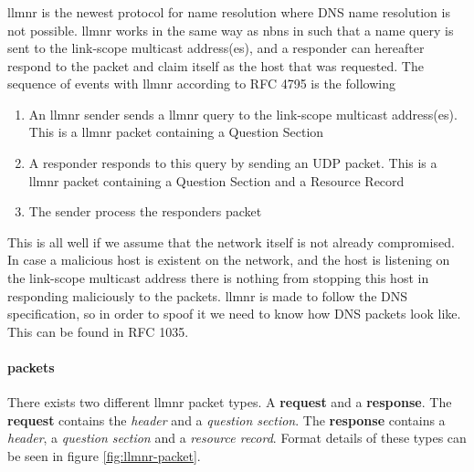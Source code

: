 \documentclass{article}
\begin{document}
\subsubsection{}
\label{sec:llmnr}
\gls{llmnr} is the newest protocol for name resolution where DNS name resolution is not possible\cite{url:rfc:llmnr}. \gls{llmnr} works in the same way as \gls{nbns} in such that a name query is sent to the link-scope multicast address(es), and a responder can hereafter respond to the packet and claim itself as the host that was requested. The sequence of events with \gls{llmnr} according to RFC 4795\cite{url:rfc:llmnr} is the following
\begin{enumerate}
	\item An \gls{llmnr} sender sends a \gls{llmnr} query to the link-scope multicast address(es). This is a \gls{llmnr} packet containing a Question Section
	\item A responder responds to this query by sending an UDP packet. This is a \gls{llmnr} packet containing a Question Section and a Resource Record
	\item The sender process the responders packet
\end{enumerate}

This is all well if we assume that the network itself is not already compromised. In case a malicious host is existent on the network, and the host is listening on the link-scope multicast address there is nothing from stopping this host in responding maliciously to the packets. \gls{llmnr} is made to follow the DNS specification, so in order to spoof it we need to know how DNS packets look like. This can be found in RFC 1035\cite{url:rfc:dns}.

\paragraph{ packets}

There exists two different \gls{llmnr} packet types. A \textbf{request} and a \textbf{response}. The \textbf{request} contains the \emph{header} and a \emph{question section}. The \textbf{response} contains a \emph{header}, a \emph{question section} and a \emph{resource record}. Format details of these types can be seen in figure \ref{fig:llmnr-packet}.
\end{document}
